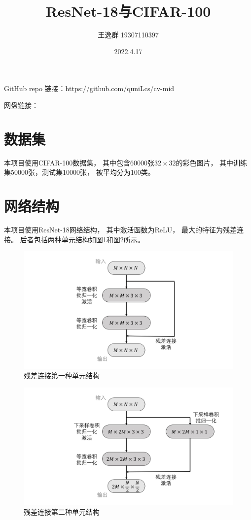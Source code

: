 \documentclass{article}
\title{ResNet-18与CIFAR-100}
\author{王逸群 19307110397}
\date{2022.4.17}
\begin{document}
\maketitle

GitHub repo 链接：https://github.com/quniLcs/cv-mid

网盘链接：

\section{数据集}

本项目使用CIFAR-100数据集，
其中包含60000张$32\times32$的彩色图片，
其中训练集50000张，测试集10000张，
被平均分为100类。

\section{网络结构}

本项目使用ResNet-18网络结构，
其中激活函数为ReLU，
最大的特征为残差连接。
后者包括两种单元结构如图\ref{fig:GraphI}和图\ref{fig:GraphII}所示。

\begin{figure}[p]
\includegraphics[width=\linewidth]{graph/I.jpg}
\caption{残差连接第一种单元结构}
\label{fig:GraphI}
\end{figure}

\begin{figure}[p]
\includegraphics[width=\linewidth]{graph/II.jpg}
\caption{残差连接第二种单元结构}
\label{fig:GraphII}
\end{figure}
\end{document}
